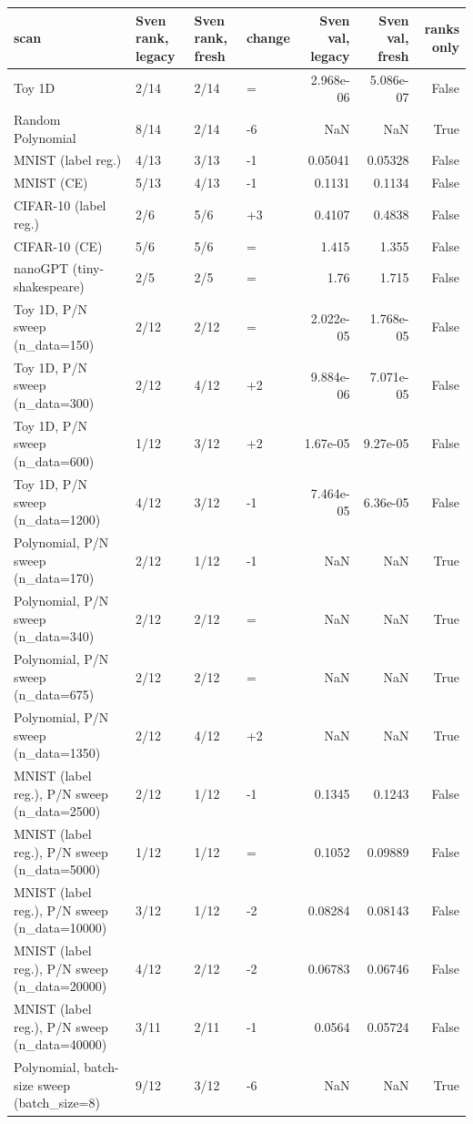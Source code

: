 \begin{tabular}{llllrrr}
\toprule
scan & Sven rank, legacy & Sven rank, fresh & change & Sven val, legacy & Sven val, fresh & ranks only \\
\midrule
Toy 1D & 2/14 & 2/14 & = & 2.968e-06 & 5.086e-07 & False \\
Random Polynomial & 8/14 & 2/14 & -6 & NaN & NaN & True \\
MNIST (label reg.) & 4/13 & 3/13 & -1 & 0.05041 & 0.05328 & False \\
MNIST (CE) & 5/13 & 4/13 & -1 & 0.1131 & 0.1134 & False \\
CIFAR-10 (label reg.) & 2/6 & 5/6 & +3 & 0.4107 & 0.4838 & False \\
CIFAR-10 (CE) & 5/6 & 5/6 & = & 1.415 & 1.355 & False \\
nanoGPT (tiny-shakespeare) & 2/5 & 2/5 & = & 1.76 & 1.715 & False \\
Toy 1D, P/N sweep (n\_data=150) & 2/12 & 2/12 & = & 2.022e-05 & 1.768e-05 & False \\
Toy 1D, P/N sweep (n\_data=300) & 2/12 & 4/12 & +2 & 9.884e-06 & 7.071e-05 & False \\
Toy 1D, P/N sweep (n\_data=600) & 1/12 & 3/12 & +2 & 1.67e-05 & 9.27e-05 & False \\
Toy 1D, P/N sweep (n\_data=1200) & 4/12 & 3/12 & -1 & 7.464e-05 & 6.36e-05 & False \\
Polynomial, P/N sweep (n\_data=170) & 2/12 & 1/12 & -1 & NaN & NaN & True \\
Polynomial, P/N sweep (n\_data=340) & 2/12 & 2/12 & = & NaN & NaN & True \\
Polynomial, P/N sweep (n\_data=675) & 2/12 & 2/12 & = & NaN & NaN & True \\
Polynomial, P/N sweep (n\_data=1350) & 2/12 & 4/12 & +2 & NaN & NaN & True \\
MNIST (label reg.), P/N sweep (n\_data=2500) & 2/12 & 1/12 & -1 & 0.1345 & 0.1243 & False \\
MNIST (label reg.), P/N sweep (n\_data=5000) & 1/12 & 1/12 & = & 0.1052 & 0.09889 & False \\
MNIST (label reg.), P/N sweep (n\_data=10000) & 3/12 & 1/12 & -2 & 0.08284 & 0.08143 & False \\
MNIST (label reg.), P/N sweep (n\_data=20000) & 4/12 & 2/12 & -2 & 0.06783 & 0.06746 & False \\
MNIST (label reg.), P/N sweep (n\_data=40000) & 3/11 & 2/11 & -1 & 0.0564 & 0.05724 & False \\
Polynomial, batch-size sweep (batch\_size=8) & 9/12 & 3/12 & -6 & NaN & NaN & True \\

\end{tabular}
